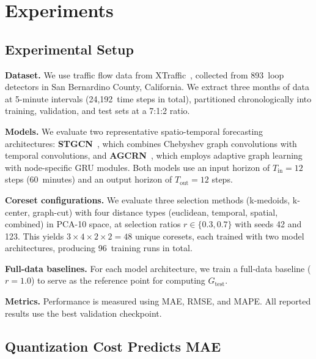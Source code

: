 \documentclass[journal]{IEEEtran}
\newcommand{\Gtest}{G_{\mathrm{test}}}
\begin{document}
\section{Experiments}
\label{sec:experiments}

\subsection{Experimental Setup}
\label{sec:exp-setup}

\textbf{Dataset.}
We use traffic flow data from XTraffic~\cite{}, collected from
893~loop detectors in San Bernardino County, California.
We extract three months of data at 5-minute intervals
(24{,}192~time steps in total), partitioned chronologically into
training, validation, and test sets at a 7:1:2 ratio.

\textbf{Models.}
We evaluate two representative spatio-temporal forecasting
architectures:
\textbf{STGCN}~\cite{yu_spatio-temporal_2018}, which combines
Chebyshev graph convolutions with temporal convolutions, and
\textbf{AGCRN}~\cite{bai_adaptive_2020}, which employs adaptive
graph learning with node-specific GRU modules.
Both models use an input horizon of $T_{\mathrm{in}} = 12$ steps
(60~minutes) and an output horizon of $T_{\mathrm{out}} = 12$ steps.

\textbf{Coreset configurations.}
We evaluate three selection methods (k-medoids, k-center, graph-cut)
with four distance types (euclidean, temporal, spatial, combined)
in PCA-10 space, at selection ratios $r \in \{0.3, 0.7\}$ with
seeds 42 and 123.
This yields $3 \times 4 \times 2 \times 2 = 48$ unique coresets,
each trained with two model architectures, producing 96~training
runs in total.

\textbf{Full-data baselines.}
For each model architecture, we train a full-data baseline
($r = 1.0$) to serve as the reference point for computing $\Gtest$.

\textbf{Metrics.}
Performance is measured using MAE, RMSE, and MAPE.
All reported results use the best validation checkpoint.

\subsection{Quantization Cost Predicts MAE}
\label{sec:exp-quant}
\end{document}
